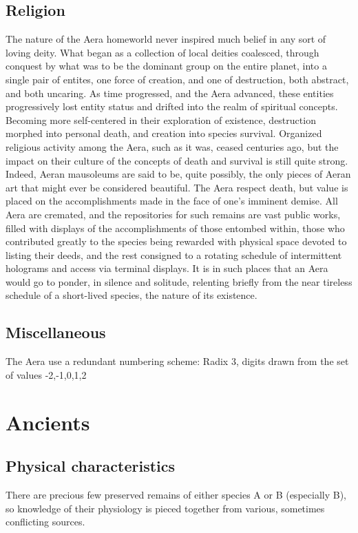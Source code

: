 \subsection{Religion}
The nature of the Aera homeworld never inspired much belief in any
sort of loving deity. What began as a collection of local deities
coalesced, through conquest by what was to be the dominant group on
the entire planet, into a single pair of entites, one force of
creation, and one of destruction, both abstract, and both uncaring. As
time progressed, and the Aera advanced, these entities progressively
lost entity status and drifted into the realm of spiritual
concepts. Becoming more self-centered in their exploration of
existence, destruction morphed into personal death, and creation into
species survival. Organized religious activity among the Aera, such as
it was, ceased centuries ago, but the impact on their culture of the
concepts of death and survival is still quite strong. Indeed, Aeran
mausoleums are said to be, quite possibly, the only pieces of Aeran
art that might ever be considered beautiful. The Aera respect death,
but value is placed on the accomplishments made in the face of one's
imminent demise. All Aera are cremated, and the repositories for such
remains are vast public works, filled with displays of the
accomplishments of those entombed within, those who contributed
greatly to the species being rewarded with physical space devoted to
listing their deeds, and the rest consigned to a rotating schedule of
intermittent holograms and access via terminal displays. It is in such
places that an Aera would go to ponder, in silence and solitude,
relenting briefly from the near tireless schedule of a short-lived
species, the nature of its existence.

\subsection{Miscellaneous}
The Aera use a redundant numbering scheme:
Radix 3, digits drawn from the set of values {-2,-1,0,1,2} 

\section{Ancients}

\subsection{Physical characteristics}
There are precious few preserved remains of either species A or B
(especially B), so knowledge of their physiology is pieced together
from various, sometimes conflicting sources.

